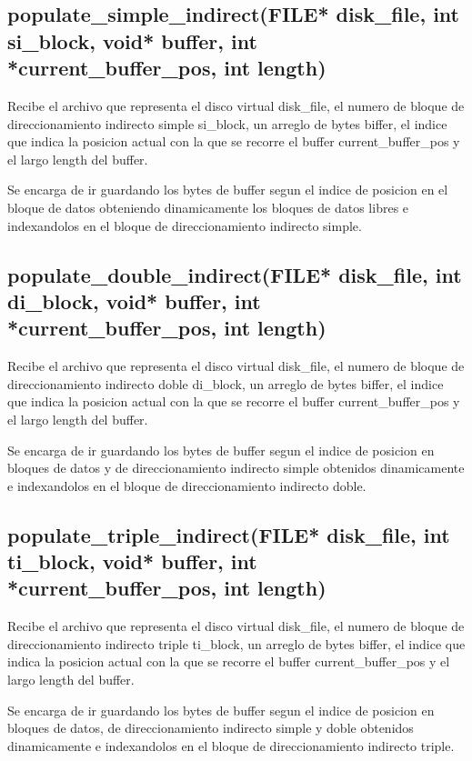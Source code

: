 \documentclass[12pt]{article}
\begin{document}
\subsection{populate\_simple\_indirect(FILE* disk\_file, int si\_block, void* buffer, int *current\_buffer\_pos, int length)}
Recibe el archivo que representa el disco virtual disk\_file, el numero de bloque de direccionamiento indirecto simple si\_block, un arreglo de bytes biffer, el indice que indica la posicion actual con la que se recorre el buffer current\_buffer\_pos y el largo length del buffer.

Se encarga de ir guardando los bytes de buffer segun el indice de posicion en el bloque de datos obteniendo dinamicamente los bloques de datos libres e indexandolos en el bloque de direccionamiento indirecto simple.


\subsection{populate\_double\_indirect(FILE* disk\_file, int di\_block, void* buffer, int *current\_buffer\_pos, int length)}
Recibe el archivo que representa el disco virtual disk\_file, el numero de bloque de direccionamiento indirecto doble di\_block, un arreglo de bytes biffer, el indice que indica la posicion actual con la que se recorre el buffer current\_buffer\_pos y el largo length del buffer.

Se encarga de ir guardando los bytes de buffer segun el indice de posicion en bloques de datos y de direccionamiento indirecto simple obtenidos dinamicamente e indexandolos en el bloque de direccionamiento indirecto doble.


\subsection{populate\_triple\_indirect(FILE* disk\_file, int ti\_block, void* buffer, int *current\_buffer\_pos, int length)}
Recibe el archivo que representa el disco virtual disk\_file, el numero de bloque de direccionamiento indirecto triple ti\_block, un arreglo de bytes biffer, el indice que indica la posicion actual con la que se recorre el buffer current\_buffer\_pos y el largo length del buffer.

Se encarga de ir guardando los bytes de buffer segun el indice de posicion en bloques de datos, de direccionamiento indirecto simple y doble obtenidos dinamicamente e indexandolos en el bloque de direccionamiento indirecto triple.
\end{document}
